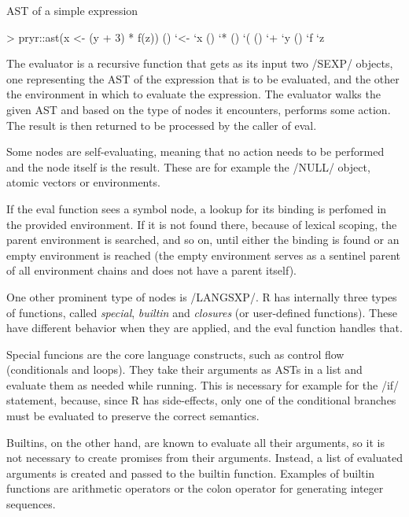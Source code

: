 {\begin{listing}[htbp]
  \caption{\label{lst:ast}AST of a simple expression}
  \begin{rcode}
> pryr::ast(x <- (y + 3) * f(z))
\- ()
  \- `<-
  \- `x
  \- ()
    \- `*
    \- ()
      \- `(
      \- ()
        \- `+
        \- `y
    \- ()
      \- `f
      \- `z
  \end{rcode}
\end{listing}

The evaluator is a recursive function that gets as its input two \cinline/SEXP/ objects, one representing the AST of the expression that is to be evaluated, and the other the environment in which to evaluate the expression. The evaluator walks the given AST and based on the type of nodes it encounters, performs some action. The result is then returned to be processed by the caller of eval.

Some nodes are self-evaluating, meaning that no action needs to be performed and the node itself is the result. These are for example the \rinline/NULL/ object, atomic vectors or environments.

If the eval function sees a symbol node, a lookup for its binding is perfomed in the provided environment. If it is not found there, because of lexical scoping, the parent environment is searched, and so on, until either the binding is found or an empty environment is reached (the empty environment serves as a sentinel parent of all environment chains and does not have a parent itself).

One other prominent type of nodes is \cinline/LANGSXP/. R has internally three types of functions, called \emph{special}, \emph{builtin} and \emph{closures} (or user-defined functions). These have different behavior when they are applied, and the eval function handles that.

Special funcions are the core language constructs, such as control flow (conditionals and loops). They take their arguments as ASTs in a list and evaluate them as needed while running. This is necessary for example for the \rinline/if/ statement, because, since R has side-effects, only one of the conditional branches must be evaluated to preserve the correct semantics.

Builtins, on the other hand, are known to evaluate all their arguments, so it is not necessary to create promises from their arguments. Instead, a list of evaluated arguments is created and passed to the builtin function. Examples of builtin functions are arithmetic operators or the colon operator for generating integer sequences.

}
